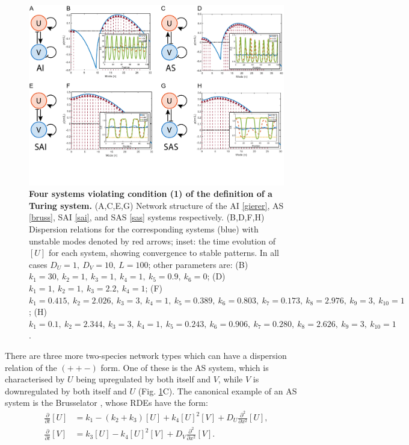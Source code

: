 \begin{figure}[ht]
\includegraphics[width=\linewidth,trim=0cm 3cm 0cm 0cm,clip=true]{disp3_1}
\caption{\textbf{Four systems violating condition (1) of the definition of a Turing system.} (A,C,E,G) Network structure of the AI \eqref{gierer}, AS \eqref{bruss}, SAI \eqref{sai}, and SAS \eqref{sas} systems respectively. (B,D,F,H) Dispersion relations for the corresponding systems (blue) with unstable modes denoted by red arrows; inset: the time evolution of $[U]$ for each system, showing convergence to stable patterns. In all cases $D_U=1,~D_V=10,~L=100$; other parameters are: (B) $k_1=30,~k_2=1,~k_3=1,~k_4=1,~k_5=0.9,~k_6=0$; (D) $k_1=1,~k_2=1,~k_3=2.2,~k_4=1$; (F) $k_1=0.415,~k_2=2.026,~k_3=3,~k_4=1,~k_5=0.389,~k_6=0.803 ,~k_7=0.173,~k_8=2.976,~k_9=3,~k_{10}=1$; (H) $k_1=0.1,~k_2=2.344,~k_3=3,~k_4=1,~k_5=0.243,~k_6=0.906,~k_7=0.280,~k_8=2.626,~k_9=3,~k_{10}=1$.}
\label{fig2}
\end{figure}

There are three more two-species network types which can have a dispersion relation of the $(++-)$ form. One of these is the AS system, which is characterised by $U$ being upregulated by both itself and $V$, while $V$ is downregulated by both itself and $U$ (Fig. \ref{fig2}C). The canonical example of an AS system is the Brusselator \cite{prigogine1968symmetry}, whose RDEs have the form:
\begin{align}\label{bruss}
  \frac{\partial}{\partial t} [U]&= k_1-(k_2+k_3)[U]+k_4[U]^2[V]+D_U\frac{\partial^2}{\partial x^2}[U],\\
  \frac{\partial}{\partial t} [V]&= k_3[U]-k_4[U]^2[V]+D_V\frac{\partial^2}{\partial x^2}[V].\nonumber
\end{align}

